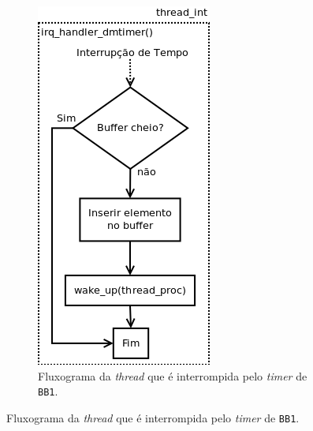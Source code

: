 	\begin{figure}[h!]
	
	\centering
	
		\begin{subfigure}{.33\textwidth}
		  \centering
		  \includegraphics[scale=0.55]{image/thread_int}
		  \caption{\centering Fluxograma da \textit{thread} que é interrompida pelo
		  \textit{timer} de \texttt{BB1}.}
		  \label{fig:thread_int}
		  

\end{subfigure}
\end{figure}
